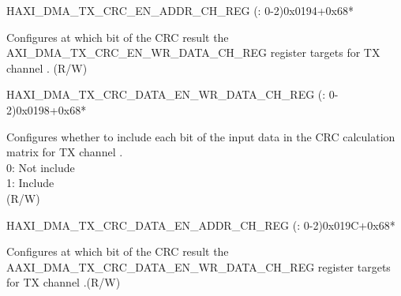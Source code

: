 \begin{register}{H}{AXI\_DMA\_TX\_CRC\_EN\_ADDR\_CH\_REG (: 0-2)}{0x0194+0x68*}\label{regdesc:AXIDMATXCRCENADDRCHNREG}
%
\regnewline%
\begin{regdesc}\begin{reglist}
\label{fielddesc:AXIDMATXCRCENADDRCHN}\item [AXI\_DMA\_TX\_CRC\_EN\_ADDR\_CH\regindex{n}] Configures at which bit of the CRC result the AXI\_DMA\_TX\_CRC\_EN\_WR\_DATA\_CH\_REG register targets for TX channel . (R/W)
\end{reglist}\end{regdesc}
\end{register}


\begin{register}{H}{AXI\_DMA\_TX\_CRC\_DATA\_EN\_WR\_DATA\_CH\_REG (: 0-2)}{0x0198+0x68*}\label{regdesc:AXIDMATXCRCDATAENWRDATACHNREG}
%
%
\regnewline%
\begin{regdesc}\begin{reglist}
\label{fielddesc:AXIDMATXCRCDATAENWRDATACHN}\item [AXI\_DMA\_TX\_CRC\_DATA\_EN\_WR\_DATA\_CH\regindex{n}] Configures whether to include each bit of the input data in the CRC calculation matrix for TX channel .\\
0: Not include\\
1: Include\\ (R/W)
\end{reglist}\end{regdesc}
\end{register}


\begin{register}{H}{AXI\_DMA\_TX\_CRC\_DATA\_EN\_ADDR\_CH\_REG (: 0-2)}{0x019C+0x68*}\label{regdesc:AXIDMATXCRCDATAENADDRCHNREG}
%
\regnewline%
\begin{regdesc}\begin{reglist}
\label{fielddesc:AXIDMATXCRCDATAENADDRCHN}\item [AXI\_DMA\_TX\_CRC\_DATA\_EN\_ADDR\_CH\regindex{n}] Configures at which bit of the CRC result the AAXI\_DMA\_TX\_CRC\_DATA\_EN\_WR\_DATA\_CH\_REG register targets for TX channel .(R/W)
\end{reglist}\end{regdesc}
\end{register}


